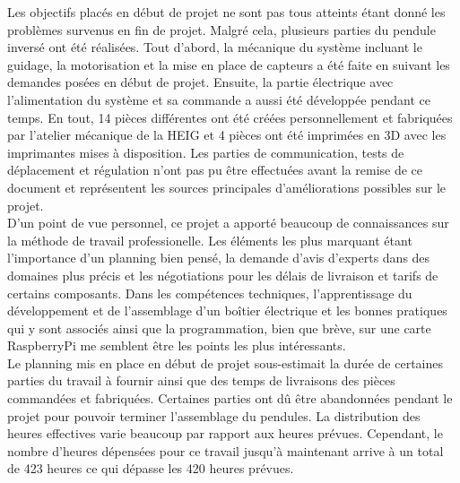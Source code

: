 Les objectifs placés en début de projet ne sont pas tous atteints étant donné les problèmes survenus en fin de projet.
Malgré cela, plusieurs parties du pendule inversé ont été réalisées. Tout d'abord, la mécanique du système incluant le guidage, la motorisation
et la mise en place de capteurs a été faite en suivant les demandes posées en début de projet. Ensuite, la partie électrique avec l'alimentation du
système et sa commande a aussi été développée pendant ce temps. En tout, 14 pièces différentes ont été créées personnellement et fabriquées par l'atelier mécanique
de la \acrshort{HEIG} et 4 pièces ont été imprimées en 3D avec les imprimantes mises à disposition. Les parties de communication, tests de déplacement
et régulation n'ont pas pu être effectuées avant la remise de ce document et représentent les sources principales d'améliorations possibles sur le
projet.\\

D'un point de vue personnel, ce projet a apporté beaucoup de connaissances sur la méthode de travail professionelle. Les éléments les plus marquant
étant l'importance d'un planning bien pensé, la demande d'avis d'experts dans des domaines plus précis et les négotiations pour les délais de livraison
et tarifs de certains composants. Dans les compétences techniques, l'apprentissage du développement et de l'assemblage d'un boîtier électrique et
les bonnes pratiques qui y sont associés ainsi que la programmation, bien que brève, sur une carte RaspberryPi me semblent être les points les plus
intéressants.\\

Le planning mis en place en début de projet sous-estimait la durée de certaines parties du travail à fournir ainsi que des temps de livraisons des
pièces commandées et fabriquées. Certaines parties ont dû être abandonnées pendant le projet pour pouvoir terminer l'assemblage du pendules. La
distribution des heures effectives varie beaucoup par rapport aux heures prévues. Cependant, le nombre d'heures dépensées pour ce travail jusqu'à
maintenant arrive à un total de 423 heures ce qui dépasse les 420 heures prévues.